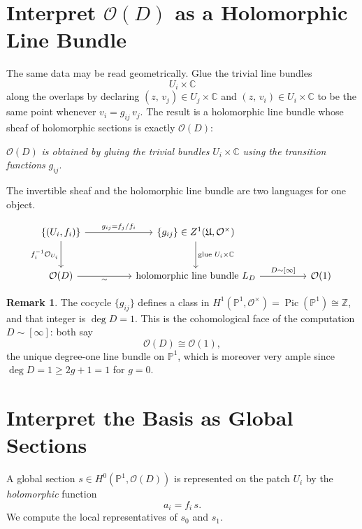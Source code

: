 \documentclass[11pt]{article}
\newcommand{\PP}{\mathbb P}
\newcommand{\CC}{\mathbb C}
\newcommand{\OO}{\mathcal O}
\newcommand{\Pic}{\operatorname{Pic}}
\theoremstyle{definition}
\newtheorem{remark}{Remark}
\theoremstyle{plain}
\begin{document}
\section{Interpret \(\OO(D)\) as a Holomorphic Line Bundle}
The same data may be read geometrically. Glue the trivial line bundles
\[
  U_i\times\CC
\]
along the overlaps by declaring \((z,\,v_j)\in U_j\times\CC\) and
\((z,\,v_i)\in U_i\times\CC\) to be the same point whenever
\(v_i=g_{ij}\,v_j\). The result is a holomorphic line bundle whose sheaf of
holomorphic sections is exactly \(\OO(D)\):
\begin{center}
\(\OO(D)\) \emph{is obtained by gluing the trivial bundles }
\(U_i\times\CC\)\emph{ using the transition functions } \(g_{ij}\).
\end{center}
The invertible sheaf and the holomorphic line bundle are two languages for one
object.

\[
\begin{tikzcd}[row sep=large, column sep=huge]
\{(U_i,f_i)\}
   \arrow[r, "g_{ij}=f_j/f_i"]
   \arrow[d, "f_i^{-1}\OO_{U_i}"']
& \{g_{ij}\}\in Z^1(\mathfrak U,\OO^\times)
   \arrow[d, "\text{glue }U_i\times\CC"] \\
\OO(D)
   \arrow[r, "\sim"']
& \text{holomorphic line bundle }L_D
   \arrow[r, "{D\sim[\infty]}"]
& \OO(1)
\end{tikzcd}
\]

\begin{remark}
The cocycle \(\{g_{ij}\}\) defines a class in
\(H^1(\PP^1,\OO^\times)=\Pic(\PP^1)\cong\mathbb Z\), and that integer is
\(\deg D=1\). This is the cohomological face of the computation
\(D\sim[\infty]\): both say
\[
  \OO(D)\cong\OO(1),
\]
the unique degree-one line bundle on \(\PP^1\), which is moreover very ample
since \(\deg D=1\ge 2g+1=1\) for \(g=0\).
\end{remark}

\section{Interpret the Basis as Global Sections}
A global section \(s\in H^0(\PP^1,\OO(D))\) is represented on the patch \(U_i\)
by the \emph{holomorphic} function
\[
  a_i=f_i\,s .
\]
We compute the local representatives of \(s_0\) and \(s_1\).
\end{document}
